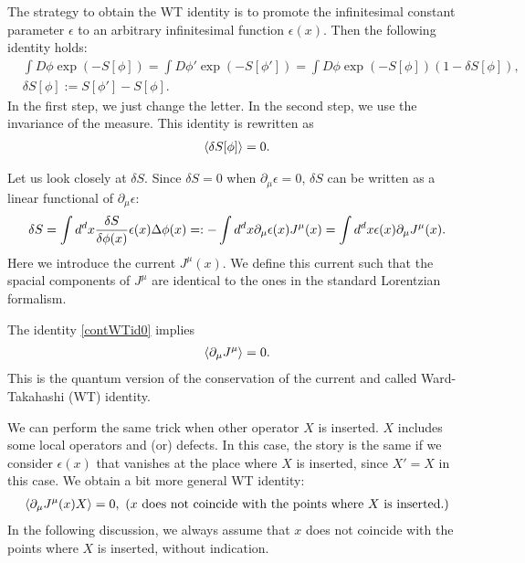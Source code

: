 \documentclass[12pt]{scrartcl}
\newcommand{\del}{\partial}
\begin{document}
The strategy to obtain the WT identity is to promote the infinitesimal constant parameter $\epsilon$ to an arbitrary infinitesimal function $\epsilon(x)$.  Then the following identity holds:
\begin{align}
    &\int D\phi \exp(-S[\phi])=
    \int D\phi' \exp(-S[\phi'])=
    \int D\phi \exp(-S[\phi]) (1-\delta S[\phi]),\\
    &\delta S[\phi]:=S[\phi']-S[\phi].
\end{align}
In the first step, we just change the letter.  In the second step, we use the invariance of the measure.
This identity is rewritten as
\begin{align}
    \expval{\delta S[\phi]}=0.
    \label{contWTid0}
\end{align}

Let us look closely at $\delta S$.  Since $\delta S=0$ when $\del_{\mu}\epsilon=0$,  $\delta S$ can be written as a linear functional of $\del_{\mu}\epsilon$:
\begin{align}
    \delta S=\int d^dx \fdv{S}{\phi(x)}\epsilon(x)\Delta\phi(x)
    =:-\int d^d x\del_{\mu}\epsilon(x) J^{\mu}(x)=
    \int d^dx \epsilon(x)\del_{\mu}J^{\mu}(x).\label{defcurrent}
\end{align}
Here we introduce the current $J^{\mu}(x)$.  We define this current such that the spacial components of $J^{\mu}$ are identical to the ones in the standard Lorentzian formalism.

The identity \eqref{contWTid0} implies
\begin{align}
    \expval{\del_{\mu}J^{\mu}}=0.
\end{align}
This is the quantum version of the conservation of the current and called Ward-Takahashi (WT) identity.

We can perform the same trick when other operator $X$ is inserted.  $X$ includes some local operators and (or) defects.  In this case, the story is the same if we consider $\epsilon(x)$ that vanishes at the place where $X$ is inserted, since $X'=X$ in this case.  We obtain a bit more general WT identity:
\begin{align}
    \expval{\del_{\mu}J^{\mu}(x) X}=0,\ (x \text{ does not coincide with the points where $X$ is inserted.})
\end{align}
In the following discussion, we always assume that $x$ does not coincide with the points where $X$ is inserted, without indication.
\end{document}
